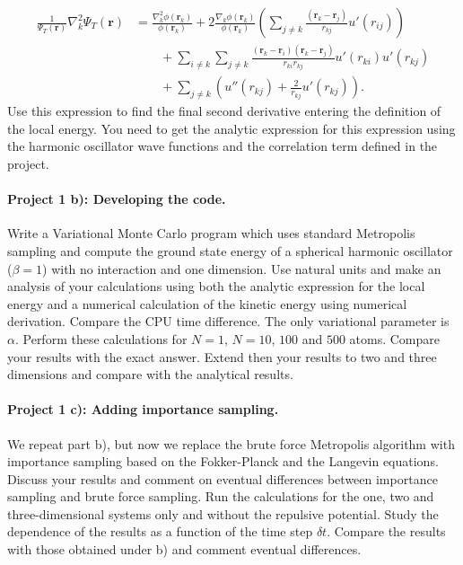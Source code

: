\documentclass[%
oneside,                 %
final,                   %
10pt]{article}
\begin{document}
\begin{align*}
   \frac{1}{\Psi_T(\mathbf{r})}\nabla_k^2\Psi_T(\mathbf{r})
   &= \frac{\nabla_k^2\phi(\mathbf{r}_k)}{\phi(\mathbf{r}_k)}
   + 2\frac{\nabla_k\phi(\mathbf{r}_k)}{\phi(\mathbf{r}_k)}
   \left(\sum_{j\ne k}\frac{(\mathbf{r}_k-\mathbf{r}_j)}{r_{kj}}u'(r_{ij})\right)
   \\
   &\qquad
   + \sum_{i\ne k}\sum_{j \ne k}\frac{(\mathbf{r}_k-\mathbf{r}_i)(\mathbf{r}_k-\mathbf{r}_j)}{r_{ki}r_{kj}}u'(r_{ki})u'(r_{kj})
   \\
   &\qquad
   + \sum_{j\ne k}\left( u''(r_{kj})+\frac{2}{r_{kj}}u'(r_{kj})\right).
\end{align*}
Use this expression to find the final second derivative entering the definition of the local energy. 
You need to get the analytic expression for this expression using the harmonic oscillator wave functions
and the correlation term defined in the project.


\paragraph{Project 1 b): Developing the code.}
Write a Variational Monte Carlo program which uses standard
   Metropolis sampling and compute the ground state energy of a
   spherical harmonic oscillator ($\beta = 1$) with no interaction and
   one dimension.  Use natural units and make an analysis of your
   calculations using both the analytic expression for the local
   energy and a numerical calculation of the kinetic energy using
   numerical derivation.  Compare the CPU time difference.  The only
   variational parameter is $\alpha$. Perform these calculations for
   $N=1$, $N=10$, $100$ and $500$ atoms. Compare your results with the
   exact answer.  Extend then your results to two and three dimensions
   and compare with the analytical results.

\paragraph{Project 1 c): Adding importance sampling.}
We repeat part b), but now we replace the brute force Metropolis algorithm with
importance sampling based on the Fokker-Planck and the Langevin equations. 
Discuss your results and comment on eventual differences between importance sampling and brute force sampling.
Run the calculations for the one, two and three-dimensional systems only and without the repulsive potential. 
Study the dependence of the results as a function of the time step $\delta t$.  
Compare the results with those obtained under b) and comment eventual differences.
\end{document}
